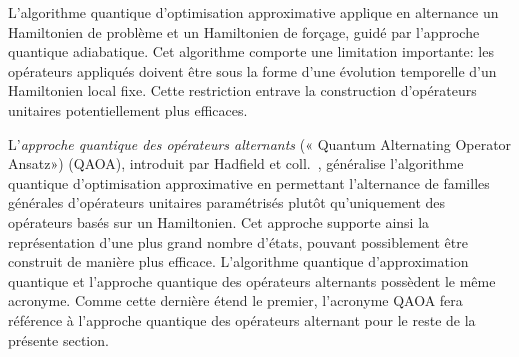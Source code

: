 L'algorithme quantique d'optimisation approximative applique en alternance un Hamiltonien de problème et un Hamiltonien de forçage, guidé par l'approche quantique adiabatique. Cet algorithme comporte une limitation importante: les opérateurs appliqués doivent être sous la forme d'une évolution temporelle d'un Hamiltonien local fixe. Cette restriction entrave la construction d'opérateurs unitaires potentiellement plus efficaces.

L'\textit{approche quantique des opérateurs alternants} (« Quantum Alternating Operator Ansatz») (QAOA), introduit par Hadfield et coll.~\cite{hadfieldQuantumApproximateOptimization2019}, généralise l'algorithme quantique d'optimisation approximative en permettant l'alternance de familles générales d'opérateurs unitaires paramétrisés plutôt qu'uniquement des opérateurs basés sur un Hamiltonien. Cet approche supporte ainsi la représentation d'une plus grand nombre d'états, pouvant possiblement être construit de manière plus efficace. L'algorithme quantique d'approximation quantique et l'approche quantique des opérateurs alternants possèdent le même acronyme. Comme cette dernière étend le premier, l'acronyme QAOA fera référence à l'approche quantique des opérateurs alternant pour le reste de la présente section.

